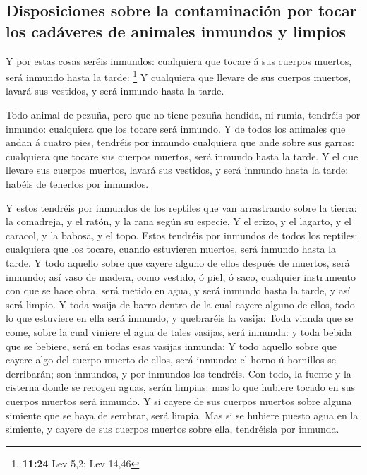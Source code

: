 \hypertarget{disposiciones-sobre-la-contaminaciuxf3n-por-tocar-los-caduxe1veres-de-animales-inmundos-y-limpios}{%
\subsection{Disposiciones sobre la contaminación por tocar los cadáveres
de animales inmundos y
limpios}\label{disposiciones-sobre-la-contaminaciuxf3n-por-tocar-los-caduxe1veres-de-animales-inmundos-y-limpios}}

 Y por estas cosas seréis inmundos: cualquiera que tocare
á sus cuerpos muertos, será inmundo hasta la tarde: \footnote{\textbf{11:24}
  Lev 5,2; Lev 14,46}  Y cualquiera que llevare de sus
cuerpos muertos, lavará sus vestidos, y será inmundo hasta la tarde.

 Todo animal de pezuña, pero que no tiene pezuña hendida,
ni rumia, tendréis por inmundo: cualquiera que los tocare será inmundo.
 Y de todos los animales que andan á cuatro pies,
tendréis por inmundo cualquiera que ande sobre sus garras: cualquiera
que tocare sus cuerpos muertos, será inmundo hasta la tarde.
 Y el que llevare sus cuerpos muertos, lavará sus
vestidos, y será inmundo hasta la tarde: habéis de tenerlos por
inmundos.

 Y estos tendréis por inmundos de los reptiles que van
arrastrando sobre la tierra: la comadreja, y el ratón, y la rana según
su especie,  Y el erizo, y el lagarto, y el caracol, y la
babosa, y el topo.  Estos tendréis por inmundos de todos
los reptiles: cualquiera que los tocare, cuando estuvieren muertos, será
inmundo hasta la tarde.  Y todo aquello sobre que cayere
alguno de ellos después de muertos, será inmundo; así vaso de madera,
como vestido, ó piel, ó saco, cualquier instrumento con que se hace
obra, será metido en agua, y será inmundo hasta la tarde, y así será
limpio.  Y toda vasija de barro dentro de la cual cayere
alguno de ellos, todo lo que estuviere en ella será inmundo, y
quebraréis la vasija:  Toda vianda que se come, sobre la
cual viniere el agua de tales vasijas, será inmunda: y toda bebida que
se bebiere, será en todas esas vasijas inmunda:  Y todo
aquello sobre que cayere algo del cuerpo muerto de ellos, será inmundo:
el horno ú hornillos se derribarán; son inmundos, y por inmundos los
tendréis.  Con todo, la fuente y la cisterna donde se
recogen aguas, serán limpias: mas lo que hubiere tocado en sus cuerpos
muertos será inmundo.  Y si cayere de sus cuerpos muertos
sobre alguna simiente que se haya de sembrar, será limpia.
 Mas si se hubiere puesto agua en la simiente, y cayere
de sus cuerpos muertos sobre ella, tendréisla por inmunda.

